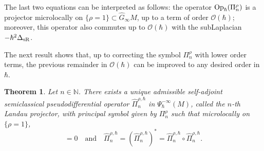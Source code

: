 \documentclass[12pt,a4paper]{amsart}
\theoremstyle{plain}
\newtheorem{theorem}{Theorem}[section]
\theoremstyle{definition}
\theoremstyle{remark}
\numberwithin{equation}{section}
\theoremstyle{definition}
\def\N{{\mathbb N}}%
\def \Op{{\rm Op}}
\def \O{\mathscr{O}}
\def \Ghat{\widehat{G}}
\numberwithin{equation}{section}
\begin{document}
The last two equations can be interpreted as follows: the operator $\Op_\hbar(\Pi_n^\rho)$ is a projector microlocally on $\{\rho = 1\}\subset\Ghat_\infty M$, up to a term of order $\O(\hbar)$; moreover, this operator also commutes up to $\O(\hbar)$ with the subLaplacian $-\hbar^2\Delta_{\rm sR}$.

The next result shows that, up to correcting the symbol $\Pi_n^\rho$ with lower order terms, the previous remainder in $\O(\hbar)$ can be improved to any desired order in $\hbar$.

\begin{theorem}
    \label{thm:superadiabproj}
    Let $n\in \N$. There exists a unique admissible self-adjoint semiclassical pseudodifferential operator $\hat{\Pi}_n^{\rho,\hbar}$ in $\Psi_\hbar^{-\infty}(M)$, called the \emph{$n$-th Landau projector}, with principal symbol given by $\Pi_n^\rho$ such that microlocally on $\{\rho=1\}$,
    \begin{equation*}
        [-\hbar^2 \Delta_{\rm sR},\hat{\Pi}_n^{\rho,\hbar}] = 0
    \quad\mbox{and}\quad
        \hat{\Pi}_n^{\rho,\hbar} = (\hat{\Pi}_n^{\rho,\hbar})^* = \hat{\Pi}_n^{\rho,\hbar}\circ \hat{\Pi}_n^{\rho,\hbar}.
    \end{equation*}
\end{theorem}
\end{document}
